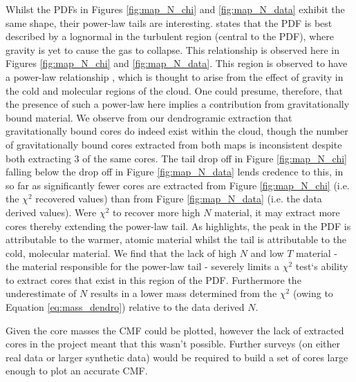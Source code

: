 \documentclass{report}
\begin{document}
Whilst the PDFs in Figures \ref{fig:map_N_chi} and \ref{fig:map_N_data} exhibit the same shape, their power-law tails are interesting. \textcite{tail} states that the PDF is best described by a lognormal in the turbulent region (central to the PDF), where gravity is yet to cause the gas to collapse. This relationship is observed here in Figures \ref{fig:map_N_chi} and \ref{fig:map_N_data}. This region is observed to have a power-law relationship \parencite{powerlaw}, which is thought to arise from the effect of gravity in the cold and molecular regions of the cloud. One could presume, therefore, that the presence of such a power-law here implies a contribution from gravitationally bound material. We observe from our dendrogramic extraction that gravitationally bound cores do indeed exist within the cloud, though the number of gravitationally bound cores extracted from both maps is inconsistent despite both extracting 3 of the same cores. The tail drop off in Figure \ref{fig:map_N_chi} falling below the drop off in Figure \ref{fig:map_N_data} lends credence to this, in so far as significantly fewer cores are extracted from Figure \ref{fig:map_N_chi} (i.e. the $\chi^{2}$ recovered values) than from Figure \ref{fig:map_N_data} (i.e. the data derived values). Were $\chi^{2}$ to recover more high $N$ material, it may extract more cores thereby extending the power-law tail. As \textcite{tail} highlights, the peak in the PDF is attributable to the warmer, atomic material whilst the tail is attributable to the cold, molecular material. We find that the lack of high $N$ and low $T$ material - the material responsible for the power-law tail - severely limits a $\chi^{2}$ test`s ability to extract cores that exist in this region of the PDF. Furthermore the underestimate of $N$  results in a lower mass determined from the $\chi^{2}$ (owing to Equation \ref{eq:mass_dendro}) relative to the data derived $N$.

Given the core masses the CMF could be plotted, however the lack of extracted cores in the project meant that this wasn't possible. Further surveys (on either real data or larger synthetic data) would be required to build a set of cores large enough to plot an accurate CMF.

\end{document}
